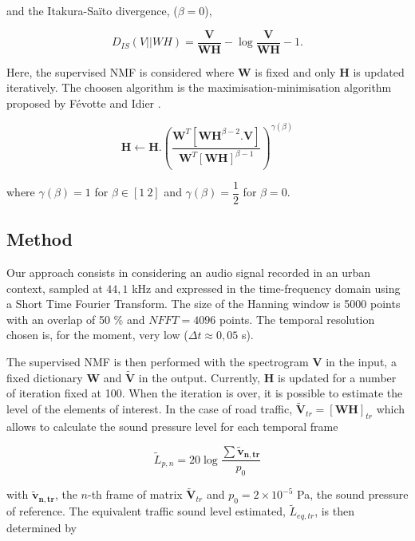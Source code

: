 \documentclass{article}
\begin{document}
\begin{sloppy}
and the Itakura-Saïto divergence, ($\beta = 0$), 
 
\begin{equation}\label{eq:divIS}
D_{IS}(V\vert\vert WH) = \frac{\mathbf{V}}{\mathbf{WH}} -\log\frac{\mathbf{V}}{\mathbf{WH}}-1.
\end{equation}

Here, the supervised NMF is considered where $\mathbf{W}$ is fixed and only $\mathbf{H}$ is updated iteratively. The choosen algorithm is the maximisation-minimisation algorithm proposed by F\'{e}votte and Idier \cite{fevotte2011}.

\begin{equation}
\mathbf{H} \longleftarrow \mathbf{H}.\left(\frac{\mathbf{W}^T\left[\mathbf{WH}^{\beta-2}.\mathbf{V} \right]}{\mathbf{W}^T \left[ \mathbf{WH} \right]^{\beta-1}}\right)^{\gamma(\beta)}
\end{equation}

where $\gamma(\beta) = 1$ for $\beta \in [1~2]$ and $\gamma(\beta) = \dfrac{1}{2}$ for $\beta = 0$. 

\subsection{Method}

Our approach consists in considering an audio signal recorded in an urban context, sampled at $44,1$ kHz and expressed in the time-frequency domain using a Short Time Fourier Transform. The size of the Hanning window is 5000 points with an overlap of 50 \% and $NFFT = 4096$ points. The temporal resolution chosen is, for the moment, very low ($\Delta t \approx 0,05$ s). 

The supervised NMF is then performed with the spectrogram $\mathbf{V}$ in the input, a fixed dictionary $\mathbf{W}$ and $\mathbf{\tilde{V}}$ in the output. Currently, $\mathbf{H}$ is updated for a number of iteration fixed at 100. When the iteration is over, it is possible to estimate the level of the elements of interest. In the case of road traffic, $\mathbf{\tilde{V}}_{tr} = \left[\mathbf{WH}\right]_{tr}$ which allows to calculate the sound pressure level for each temporal frame

\begin{equation}\label{eq:Lp}
\tilde{L}_{p,n} = 20\log\frac{\sum\mathbf{\mathbf{\tilde{v}}_{\mathbf{n},tr}}}{p_{0}}
\end{equation} 


with $\mathbf{\tilde{v}_{n,tr}}$, the $n$-th frame of matrix $\mathbf{\tilde{V}}_{tr}$ and $ p_{0} = 2\times 10^{-5}$ Pa, the sound pressure of reference. The equivalent traffic sound level estimated, $\tilde{L}_{eq,tr}$, is then determined by


\end{sloppy}
\end{document}
